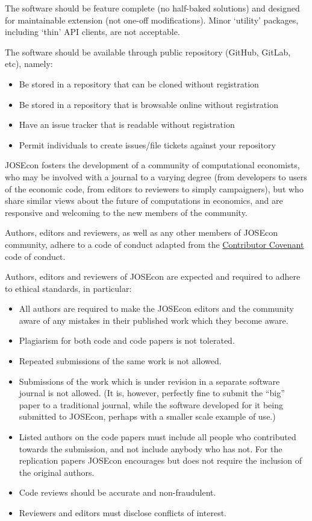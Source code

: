 The software should be feature complete (no half-baked solutions) and designed for 
maintainable extension (not one-off modifications). 
Minor ‘utility’ packages, including ‘thin’ API clients, are not acceptable.

The software should be available through public repository (GitHub, GitLab, etc),
namely:
\begin{itemize}
\item Be stored in a repository that can be cloned without registration
\item Be stored in a repository that is browsable online without registration
\item Have an issue tracker that is readable without registration
\item Permit individuals to create issues/file tickets against your repository
\end{itemize}

JOSEcon fosters the development of a community of computational economists, who may be
involved with a journal to a varying degree (from developers to users of the economic code,
from editors to reviewers to simply campaigners), but who share similar views about the
future of computations in economics, and are responsive and welcoming to the new 
members of the community.

Authors, editors and reviewers, as well as any other members of JOSEcon community,
adhere to a code of conduct adapted from the 
\href{http://contributor-covenant.org/}{Contributor Covenant} code of conduct.

Authors, editors and reviewers of JOSEcon are expected and required to adhere to ethical
standards, in particular:
\begin{itemize}
\item All authors are required to make the JOSEcon editors and the community aware of any 
mistakes in their published work which they become aware.
\item Plagiarism for both code and code papers is not tolerated.
\item Repeated submissions of the same work is not allowed. 
\item Submissions of the work which is under revision in a separate software journal is not allowed. 
(It is, however, perfectly fine to submit the ``big'' paper to a traditional journal, while the software
developed for it being submitted to JOSEcon, perhaps with a smaller scale example of use.)
\item Listed authors on the code papers must include all people who contributed towards the submission, 
and not include anybody who has not. 
For the replication papers JOSEcon encourages but does not require the inclusion of the original authors.
\item Code reviews should be accurate and non-fraudulent. 
\item Reviewers and editors must disclose conflicts of interest.
\end{itemize}

